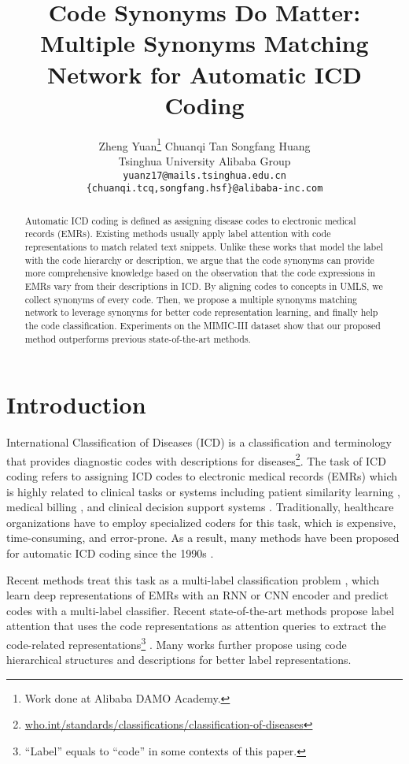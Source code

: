 \documentclass[11pt]{article}
\title{Code Synonyms Do Matter: \\ Multiple Synonyms Matching Network for Automatic ICD Coding}
\author{
Zheng Yuan\thanks{Work done at Alibaba DAMO Academy.} \space\space\space
Chuanqi Tan \space\space
Songfang Huang \space\space\\
Tsinghua University \space\space\space\space
Alibaba Group\\
\texttt{yuanz17@mails.tsinghua.edu.cn}\\
\texttt{\{chuanqi.tcq,songfang.hsf\}@alibaba-inc.com}
}
\date{}
\begin{document}
\maketitle
\begin{abstract}
Automatic ICD coding is defined as assigning disease codes to electronic medical records (EMRs).
Existing methods usually apply label attention with code representations to match related text snippets.
Unlike these works that model the label with the code hierarchy or description, we argue that the code synonyms can provide more comprehensive knowledge based on the observation that the code expressions in EMRs vary from their descriptions in ICD. 
By aligning codes to concepts in UMLS, we collect synonyms of every code. Then, we propose a multiple synonyms matching network to leverage synonyms for better code representation learning, and finally help the code classification. 
Experiments on the MIMIC-III dataset show that our proposed method outperforms previous state-of-the-art methods.

\end{abstract}

\section{Introduction}
International Classification of Diseases (ICD) is a classification and terminology that provides diagnostic codes with descriptions for diseases\footnote{\url{who.int/standards/classifications/classification-of-diseases}}.
The task of ICD coding refers to assigning ICD codes to electronic medical records (EMRs) which is highly related to clinical tasks or systems including patient similarity learning \cite{suo2018deep}, medical billing \cite{sonabend2020automated}, and clinical decision support systems \cite{sutton2020overview}. Traditionally, healthcare organizations have to employ specialized coders for this task, which is expensive, time-consuming, and error-prone. As a result, many methods have been proposed for automatic ICD coding since the 1990s \cite{de1998hierarchical}.






Recent methods treat this task as a multi-label classification problem \cite{xie2018neural,li2020icd,zhou2021automatic}, which learn deep representations of EMRs with an RNN or CNN encoder and predict codes with a multi-label classifier.
Recent state-of-the-art methods propose label attention that uses the code representations as attention queries to extract the code-related representations\footnote{``Label'' equals to ``code'' in some contexts of this paper.} \cite{mullenbach-etal-2018-explainable}.
Many works further propose using code hierarchical structures \cite{falis2019ontological,xie2019ehr,cao2020hypercore} and descriptions \cite{ijcai2020-556,kim2021read} for better label representations.
\end{document}
